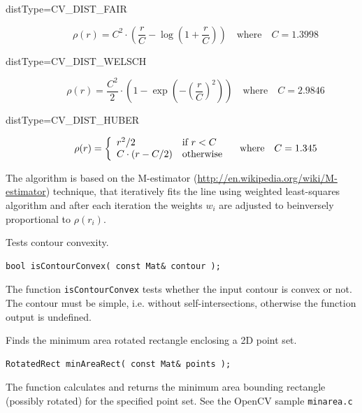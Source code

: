 \begin{description}
\begin{description}
\item[distType=CV\_DIST\_FAIR]
\[ \rho\left(r\right) = C^2 \cdot \left( \frac{r}{C} - \log{\left(1 + \frac{r}{C}\right)}\right) \quad \text{where} \quad C=1.3998 \]

\item[distType=CV\_DIST\_WELSCH]
\[ \rho\left(r\right) = \frac{C^2}{2} \cdot \left( 1 - \exp{\left(-\left(\frac{r}{C}\right)^2\right)}\right) \quad \text{where} \quad C=2.9846 \]

\item[distType=CV\_DIST\_HUBER]
\[ \rho(r) = \left\{ \begin{array}{l l} r^2/2 & \mbox{if $r < C$}\\ C \cdot (r-C/2) & \mbox{otherwise}\\ \end{array} \right.  \quad \text{where} \quad C=1.345
\]
\end{description}

The algorithm is based on the M-estimator (\url{http://en.wikipedia.org/wiki/M-estimator}) technique, that iteratively fits the line using weighted least-squares algorithm and after each iteration the weights $w_i$ are adjusted to beinversely proportional to $\rho(r_i)$. 


\label{isContourConvex}
Tests contour convexity.

\begin{lstlisting}
bool isContourConvex( const Mat& contour );
\end{lstlisting}
\begin{description}
\end{description}

The function \texttt{isContourConvex} tests whether the input contour is convex or not. The contour must be simple, i.e. without self-intersections, otherwise the function output is undefined.


\label{minAreaRect}
Finds the minimum area rotated rectangle enclosing a 2D point set.

\begin{lstlisting}
RotatedRect minAreaRect( const Mat& points );
\end{lstlisting}
\begin{description}
\end{description}

The function calculates and returns the minimum area bounding rectangle (possibly rotated) for the specified point set. See the OpenCV sample \texttt{minarea.c}


\end{description}

